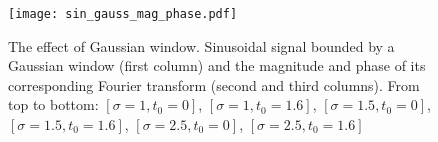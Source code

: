 \begin{figure}
\centering
\texttt{[image: sin\_gauss\_mag\_phase.pdf]}
\caption{The effect of Gaussian window. Sinusoidal signal bounded by a Gaussian window (first column) and the magnitude and phase of its corresponding Fourier transform (second and third columns). From top to bottom: $[\sigma=1, t_0=0]$, $[\sigma=1, t_0=1.6]$, $[\sigma=1.5, t_0=0]$, $[\sigma=1.5, t_0=1.6]$, $[\sigma=2.5, t_0=0]$, $[\sigma=2.5, t_0=1.6]$}\label{fig:gaussian_window_mag_phase}
\end{figure}






